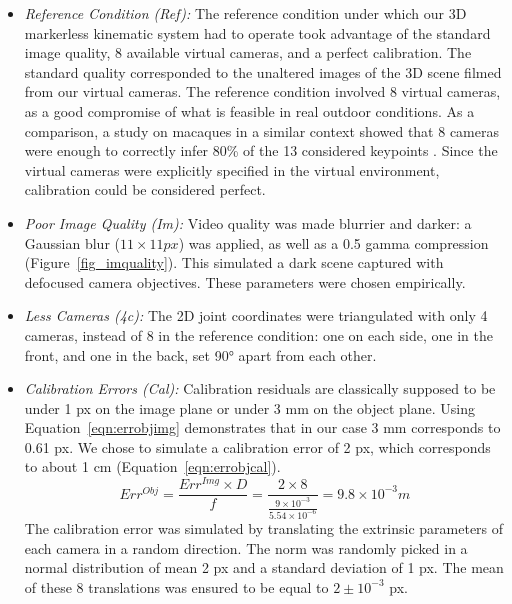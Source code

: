 \begin{itemize}[itemsep=0em, topsep=0em, leftmargin=*]
      \item \textit{Reference Condition (Ref):} The reference condition under which our 3D markerless kinematic system had to operate took advantage of the standard image quality, 8 available virtual cameras, and a perfect calibration. The standard quality corresponded to the unaltered images of the 3D scene filmed from our virtual cameras. The reference condition involved 8 virtual cameras, as a good compromise of what is feasible in real outdoor conditions. As a comparison, a study on macaques in a similar context showed that 8 cameras were enough to correctly infer 80\% of the 13 considered keypoints \cite{Bala2020}. Since the virtual cameras were explicitly specified in the virtual environment, calibration could be considered perfect.
      \item \textit{Poor Image Quality (Im):} Video quality was made blurrier and darker: a Gaussian blur (\(11 \times 11 px\)) was applied, as well as a 0.5 gamma compression (Figure~\ref{fig_imquality}). This simulated a dark scene captured with defocused camera objectives. These parameters were chosen empirically.
      \item \textit{Less Cameras (4c):} The 2D joint coordinates were triangulated with only 4 cameras, instead of 8 in the reference condition: one on each side, one in the front, and one in the back, set 90° apart from each other.
      \item \textit{Calibration Errors (Cal):} Calibration residuals are classically supposed to be under 1 px on the image plane or under 3 mm on the object plane. Using Equation~\ref{eqn:errobjimg} demonstrates that in our case 3 mm corresponds to 0.61 px. We chose to simulate a calibration error of 2 px, which corresponds to about 1 cm (Equation~\ref{eqn:errobjcal}).
      \begin{equation}
            Err^{Obj} = \frac{Err^{Img} \times D}{f} = \frac{2 \times 8}{\frac{9 \times 10^{-3}}{5.54 \times 10^{-6}}} = 9.8 \times 10^{-3} m
            \label{eqn:errobjcal}
      \end{equation} 
      The calibration error was simulated by translating the extrinsic parameters of each camera in a random direction. The norm was randomly picked in a normal distribution of mean 2 px and a standard deviation of 1 px. The mean of these 8 translations was ensured to be equal to \(2 ± 10^{-3}\) px.
\end{itemize}

